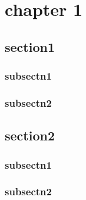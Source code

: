 \documentclass[12pt,a4paper]{report}
\begin{document}
    
    \chapter{chapter 1}
    \section{section1}
    \subsection{subsectn1}
    \subsection{subsectn2}
    \section{section2}
    \subsection{subsectn1}
    \subsection{subsectn2}

    
    
    
    
    
    

    \startMainMatter

    
    
    
    
    

    
    
    
    
\end{document}
